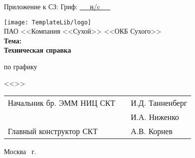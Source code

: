 \newcommand{\названиеКомпании}
{ПАО <<Компания <<Сухой>> <<ОКБ Сухого>>}
\begin{titlepage}
\thisfancypage{%
\setlength{\fboxsep}{2pt}\fbox}{}
Приложение к СЗ:   \hfill Гриф: \underline{~~~н/c~~~} \\
\begin{center}
\texttt{[image: TemplateLib/logo]} \\
{\large \названиеКомпании}
\vspace{4cm}\\
{\textbf{\large Тема: }} \\
\vspace{0.5cm}
{\Large \textbf{Техническая справка}}\\
\vspace{0.5cm}

по графику  \\
\vspace{0.5cm}

{\Large << >> }\\
\vfill
\makeatletter
{
\renewcommand{\arraystretch}{3}
\begin{tabular}{L{.45\textwidth}cR{.45\textwidth}}%
	Начальник бр. ЭММ НИЦ СКТ & & И.Д. Танненберг \\
	 & & И.А. Ниженко \\
	Главный конструктор СКТ & & А.В. Корнев \\ 
\end{tabular} 
}
\makeatother
\vfill

Москва \the\year ~г.
\end{center}

\restoregeometry
\end{titlepage}
